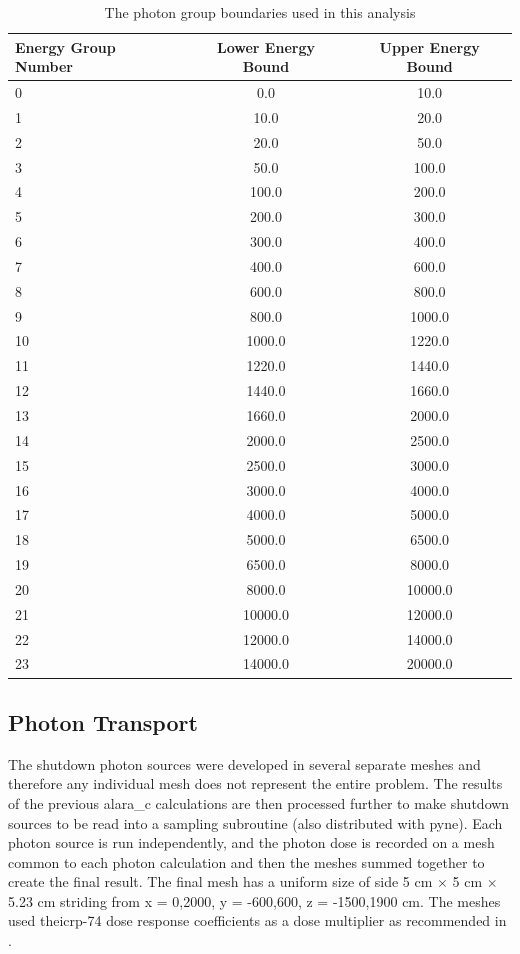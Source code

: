 \documentclass[12pt]{article}
\begin{document}
\begin{table}[ht!]
   \begin{tabular}{| l | c | c |}
      \hline
      Energy Group Number & Lower Energy Bound & Upper Energy Bound \\
      \hline
      0 & 0.0 & 10.0 \\
      1 & 10.0 & 20.0 \\
      2 & 20.0 & 50.0 \\
      3 & 50.0 & 100.0 \\
      4 & 100.0 & 200.0 \\
      5 & 200.0 & 300.0 \\
      6 & 300.0 & 400.0 \\
      7 & 400.0 & 600.0 \\
      8 & 600.0 & 800.0 \\
      9 & 800.0 & 1000.0 \\
      10 & 1000.0 & 1220.0 \\
      11 & 1220.0 & 1440.0 \\
      12 & 1440.0 & 1660.0 \\
      13 & 1660.0 & 2000.0 \\
      14 & 2000.0 & 2500.0 \\
      15 & 2500.0 & 3000.0 \\
      16 & 3000.0 & 4000.0 \\
      17 & 4000.0 & 5000.0 \\
      18 & 5000.0 & 6500.0 \\
      19 & 6500.0 & 8000.0 \\  
      20 & 8000.0 & 10000.0 \\
      21 & 10000.0 & 12000.0 \\
      22 & 12000.0 & 14000.0 \\
      23 & 14000.0 & 20000.0 \\  
      \hline
\end{tabular}
\caption{The photon group boundaries used in this analysis}
\label{tab:photon_boundaries}
\end{table}

\subsection{Photon Transport}
The shutdown photon sources were developed in several separate meshes and
therefore any individual mesh does not represent the entire problem. The
results of the previous \gls{alara_c} calculations are then processed further
to make shutdown sources to be read into a sampling subroutine (also distributed
with \gls{pyne}). Each photon source is run independently, and the photon dose
is recorded on a mesh common to each photon calculation and then the meshes
summed together to create the final result. The final mesh has a uniform size of
side 5 cm $\times$ 5 cm $\times$ 5.23 cm striding from x = {0,2000}, y = {-600,600},
 z = {-1500,1900} cm. The meshes used the\gls{icrp}-74 dose response coefficients 
as a dose multiplier as recommended in \cite{iter_sdr_coeffs}.
\\
\\
\end{document}
